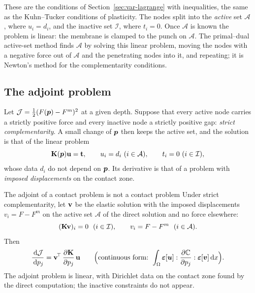  These are the conditions of
Section~\ref{sec:var-lagrange} with inequalities, the same as the Kuhn--Tucker
conditions of plasticity. The nodes split into the \emph{active} set
$\mathcal A$, where $u_i=d_i$, and the inactive set $\mathcal I$, where $t_i=0$.
Once $\mathcal A$ is known the problem is linear: the membrane is clamped to the
punch on $\mathcal A$. The primal--dual active-set method finds $\mathcal A$ by
solving this linear problem, moving the nodes with a negative force out of
$\mathcal A$ and the penetrating nodes into it, and repeating; it is Newton's
method for the complementarity conditions.

\subsection{The adjoint problem}
Let $\mathcal J=\tfrac12(F(\bm{p})-F^m)^2$ at a given depth. Suppose that every
active node carries a strictly positive force and every inactive node a strictly
positive gap: \emph{strict complementarity}. A small change of $\bm{p}$ then keeps
the active set, and the solution is that of the linear problem
\begin{equation}\label{eq:id-contact-lin}
  \mathbf{K}(\bm{p})\mathbf{u}=\mathbf{t},\qquad u_i=d_i\ (i\in\mathcal A),\qquad t_i=0\ (i\in\mathcal I),
\end{equation}
whose data $d_i$ do not depend on $\bm{p}$. Its derivative is that of a problem with
\emph{imposed displacements} on the contact zone.

\begin{gbox}{The adjoint of a contact problem is not a contact problem}\label{prop:id-contact}
Under strict complementarity, let $\mathbf{v}$ be the elastic solution with the
imposed displacements $v_i=F-F^m$ on the active set $\mathcal A$ of the direct
solution and no force elsewhere:
\begin{equation}\label{eq:id-contact-adj}
  (\mat{K}\mat{v})_i=0\ \ (i\in\mathcal I),\qquad v_i=F-F^m\ \ (i\in\mathcal A).
\end{equation}
Then
\begin{equation}\label{eq:id-contact-grad}
  \frac{\,\mathrm{d}\mathcal J}{\,\mathrm{d} p_j}=\mathbf{v}^{\!\top}\,\frac{\partial\mathbf{K}}{\partial p_j}\,\mathbf{u}
  \qquad\Bigl(\text{continuous form: }
  \int_\Omega\bm{\varepsilon}[\bm{u}]:\frac{\partial\mathbb{C}}{\partial p_j}:\bm{\varepsilon}[\bm{v}]\,\mathrm{d} x\Bigr).
\end{equation}
The adjoint problem is linear, with Dirichlet data on the contact zone found by
the direct computation; the inactive constraints do not appear.
\end{gbox}
